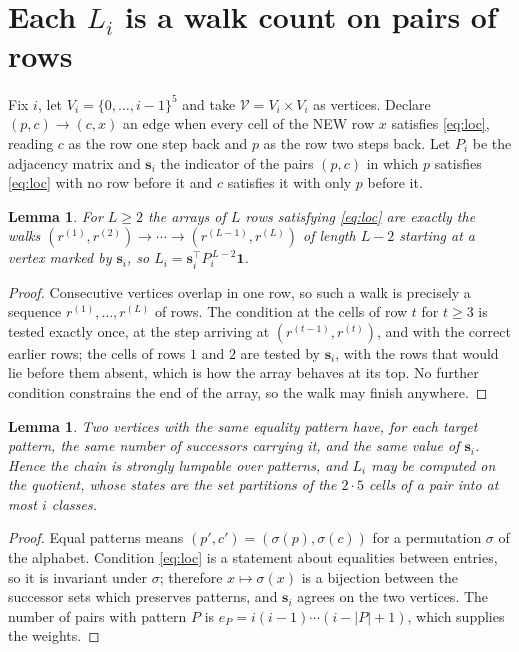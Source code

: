 \documentclass[11pt,a4paper]{article}
\theoremstyle{plain}
\newtheorem{lemma}[theorem]{Lemma}
\theoremstyle{definition}
\begin{document}
\section{Each $L_i$ is a walk count on pairs of rows}

Fix $i$, let $V_i=\{0,\dots,i-1\}^{5}$ and take $\mathcal V=V_i\times V_i$ as vertices.
Declare $(p,c)\to(c,x)$ an edge when every cell of the NEW row $x$ satisfies
\eqref{eq:loc}, reading $c$ as the row one step back and $p$ as the row two steps
back. Let $P_i$ be the adjacency matrix and $\mathbf{s}_i$ the indicator of the pairs
$(p,c)$ in which $p$ satisfies \eqref{eq:loc} with no row before it and $c$ satisfies it
with only $p$ before it.

\begin{lemma}\label{lem:walk}
For $L\ge2$ the arrays of $L$ rows satisfying \eqref{eq:loc} are exactly the walks
$(r^{(1)},r^{(2)})\to\cdots\to(r^{(L-1)},r^{(L)})$ of length $L-2$ starting at a
vertex marked by $\mathbf{s}_i$, so
$L_i=\mathbf{s}_i^{\!\top}P_i^{\,L-2}\mathbf{1}$.
\end{lemma}

\begin{proof}
Consecutive vertices overlap in one row, so such a walk is precisely a sequence
$r^{(1)},\dots,r^{(L)}$ of rows. The condition at the cells of row $t$ for $t\ge3$
is tested exactly once, at the step arriving at $(r^{(t-1)},r^{(t)})$, and with the
correct earlier rows; the cells of rows $1$ and $2$ are tested by $\mathbf{s}_i$, with
the rows that would lie before them absent, which is how the array behaves at its top. No
further condition constrains the end of the array, so the walk may finish anywhere.
\end{proof}

\begin{lemma}\label{lem:lump}
Two vertices with the same equality pattern have, for each target pattern, the same number of
successors carrying it, and the same value of $\mathbf{s}_i$. Hence the chain is strongly
lumpable over patterns, and $L_i$ may be computed on the quotient, whose states are the set
partitions of the $2\cdot5$ cells of a pair into at most $i$ classes.
\end{lemma}

\begin{proof}
Equal patterns means $(p',c')=(\sigma(p),\sigma(c))$ for a permutation $\sigma$ of the
alphabet. Condition \eqref{eq:loc} is a statement about equalities between entries, so it is
invariant under $\sigma$; therefore $x\mapsto\sigma(x)$ is a bijection between the successor
sets which preserves patterns, and $\mathbf{s}_i$ agrees on the two vertices. The number of
pairs with pattern $P$ is $e_P=i(i-1)\cdots(i-|P|+1)$, which supplies the weights.
\end{proof}
\end{document}
